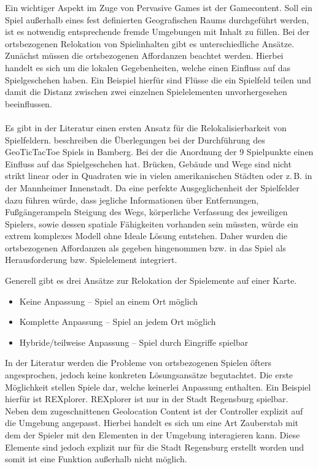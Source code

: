 Ein wichtiger Aspekt im Zuge von Pervasive Games ist der Gamecontent. Soll ein Spiel außerhalb eines fest definierten Geografischen Raums durchgeführt werden, ist es notwendig entsprechende fremde Umgebungen mit Inhalt zu füllen. \cite{Montola.2005} 
Bei der ortsbezogenen Relokation von Spielinhalten gibt es unterschiedliche Ansätze.
Zunächst müssen die ortsbezogenen Affordanzen beachtet werden. Hierbei handelt es sich um die lokalen Gegebenheiten, welche einen Einfluss auf das Spielgeschehen haben. Ein Beispiel hierfür sind Flüsse die ein Spielfeld teilen und damit die Distanz zwischen zwei einzelnen Spielelementen unvorhergesehen beeinflussen.
\\\\
Es gibt in der Literatur einen ersten Ansatz für die Relokalisierbarkeit von Spielfeldern.
\textcite{Kiefer.2005} beschreiben die Überlegungen bei der Durchführung des GeoTicTacToe Spiels in Bamberg. Bei der die Anordnung der 9 Spielpunkte einen Einfluss auf das Spielgeschehen hat. Brücken, Gebäude und Wege sind nicht strikt linear oder in Quadraten wie in vielen amerikanischen Städten oder z.\,B. in der Mannheimer Innenstadt. Da eine perfekte Ausgeglichenheit der Spielfelder dazu führen würde, dass jegliche Informationen über Entfernungen, Fußgängerampeln Steigung des Wegs, körperliche Verfassung des jeweiligen Spielers, sowie dessen spatiale Fähigkeiten vorhanden sein müssten, würde ein extrem komplexes Modell ohne Ideale Lösung entstehen. Daher wurden die ortsbezogenen Affordanzen als gegeben hingenommen bzw. in das Spiel als Herausforderung bzw. Spielelement integriert.

Generell gibt es drei Ansätze zur Relokation der Spielemente auf einer Karte.

\begin{itemize}
\item Keine Anpassung -- Spiel an einem Ort möglich
\item Komplette Anpassung -- Spiel an jedem Ort möglich
\item Hybride/teilweise Anpassung -- Spiel durch Eingriffe spielbar
\end{itemize}

In der Literatur werden die Probleme von ortsbezogenen Spielen öfters angesprochen, jedoch keine konkreten Lösungsansätze begutachtet.
Die erste Möglichkeit stellen Spiele dar, welche keinerlei Anpassung enthalten.
Ein Beispiel hierfür ist REXplorer.\cite{Ballagas.2007} REXplorer ist nur in der Stadt Regensburg spielbar. Neben dem zugeschnittenen Geolocation Content ist der Controller explizit auf die Umgebung angepasst.
Hierbei handelt es sich um eine Art Zauberstab mit dem der Spieler mit den Elementen in der Umgebung interagieren kann. Diese Elemente sind jedoch explizit nur für die Stadt Regensburg erstellt worden und somit ist eine Funktion außerhalb nicht möglich.

